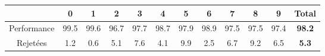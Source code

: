 \documentclass[a4paper,11pt,twoside]{report}
\begin{document}
\begin{center}
\begin{tabular}{ |c||c|c|c|c|c|c|c|c|c|c|c| } 
 \hline
   & 0 & 1 & 2 & 3 & 4 & 5 & 6 & 7 & 8 & 9 & \textbf{Total} \\ 
  \hline
  \hline
 Performance & 99.5 & 99.6 & 96.7 & 97.7 & 98.7 & 97.9 & 98.9 & 97.5 & 97.5 & 97.4 &  \textbf{98.2} \\
  \hline
 Rejetées & 1.2 & 0.6 & 5.1 & 7.6 & 4.1 & 9.9 & 2.5 & 6.7 & 9.2 & 6.5 & \textbf{5.3} \\
 \hline
\end{tabular}
\end{center}



  
\nocite{*} 

%
\end{document}
